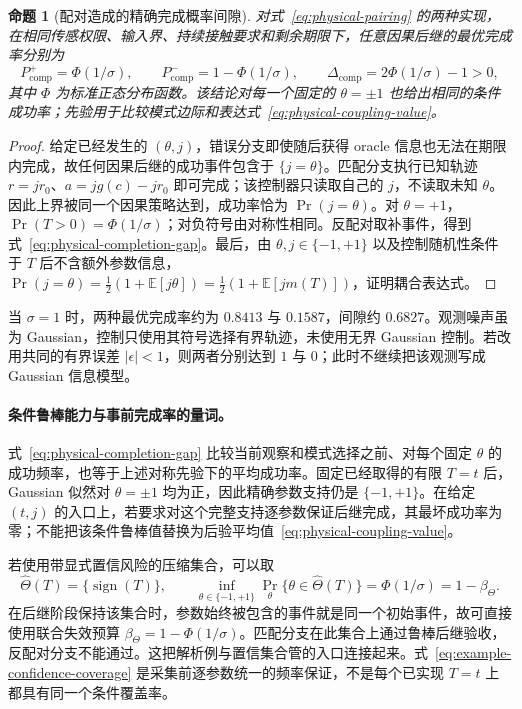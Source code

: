 \documentclass[UTF8,fontset=fandol,zihao=5,a4paper]{ctexart}
\newtheorem{proposition}[theorem]{命题}
\theoremstyle{definition}
\theoremstyle{remark}\newtheorem{remark}[theorem]{说明}
\numberwithin{equation}{section}
\begin{document}
\begin{proposition}[配对造成的精确完成概率间隙]
\label{prop:physical-coupling-gap}
对式~\eqref{eq:physical-pairing} 的两种实现，在相同传感权限、输入界、持续接触要求和剩余期限下，任意因果后继的最优完成率分别为
\begin{equation}
P_{\mathrm{comp}}^+=\Phi(1/\sigma),\qquad
P_{\mathrm{comp}}^-=1-\Phi(1/\sigma),
\qquad
\Delta_{\mathrm{comp}}=2\Phi(1/\sigma)-1>0,
\label{eq:physical-completion-gap}
\end{equation}
其中 \(\Phi\) 为标准正态分布函数。该结论对每一个固定的 \(\theta=\pm1\) 也给出相同的条件成功率；先验用于比较模式边际和表达式~\eqref{eq:physical-coupling-value}。
\end{proposition}
\begin{proof}
给定已经发生的 \((\theta,j)\)，错误分支即使随后获得 oracle 信息也无法在期限内完成，故任何因果后继的成功事件包含于 \(\{j=\theta\}\)。匹配分支执行已知轨迹 \(r=jr_0\)、\(a=jg(c)-jr_0\) 即可完成；该控制器只读取自己的 \(j\)，不读取未知 \(\theta\)。因此上界被同一个因果策略达到，成功率恰为 \(\Pr(j=\theta)\)。对 \(\theta=+1\)，\(\Pr(T>0)=\Phi(1/\sigma)\)；对负符号由对称性相同。反配对取补事件，得到式~\eqref{eq:physical-completion-gap}。最后，由 \(\theta,j\in\{-1,+1\}\) 以及控制随机性条件于 \(T\) 后不含额外参数信息，
\(\Pr(j=\theta)=\frac12(1+\mathbb E[j\theta])=\frac12(1+\mathbb E[jm(T)])\)，证明耦合表达式。
\end{proof}

当 \(\sigma=1\) 时，两种最优完成率约为 \(0.8413\) 与 \(0.1587\)，间隙约 \(0.6827\)。观测噪声虽为 Gaussian，控制只使用其符号选择有界轨迹，未使用无界 Gaussian 控制。若改用共同的有界误差 \(|\epsilon|<1\)，则两者分别达到 \(1\) 与 \(0\)；此时不继续把该观测写成 Gaussian 信息模型。

\paragraph{条件鲁棒能力与事前完成率的量词。}
式~\eqref{eq:physical-completion-gap} 比较当前观察和模式选择之前、对每个固定 \(\theta\) 的成功频率，也等于上述对称先验下的平均成功率。固定已经取得的有限 \(T=t\) 后，Gaussian 似然对 \(\theta=\pm1\) 均为正，因此精确参数支持仍是 \(\{-1,+1\}\)。在给定 \((t,j)\) 的入口上，若要求对这个完整支持逐参数保证后继完成，其最坏成功率为零；不能把该条件鲁棒值替换为后验平均值~\eqref{eq:physical-coupling-value}。

若使用带显式置信风险的压缩集合，可以取
\begin{equation}
\widehat\Theta(T)=\{\operatorname{sign}(T)\},\qquad
\inf_{\theta\in\{-1,+1\}}
\Pr_\theta\{\theta\in\widehat\Theta(T)\}
=\Phi(1/\sigma)=1-\beta_\Theta.
\label{eq:example-confidence-coverage}
\end{equation}
在后继阶段保持该集合时，参数始终被包含的事件就是同一个初始事件，故可直接使用联合失效预算 \(\beta_\Theta=1-\Phi(1/\sigma)\)。匹配分支在此集合上通过鲁棒后继验收，反配对分支不能通过。这把解析例与置信集合管的入口连接起来。式~\eqref{eq:example-confidence-coverage} 是采集前逐参数统一的频率保证，不是每个已实现 \(T=t\) 上都具有同一个条件覆盖率。
\end{document}
